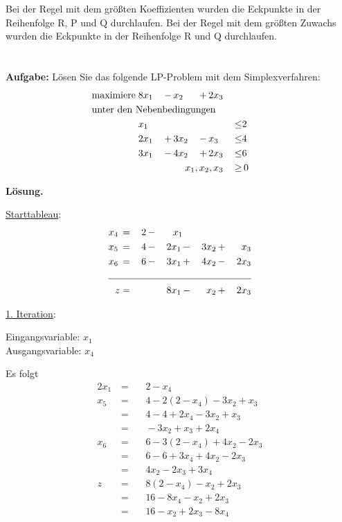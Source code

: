 \documentclass[10pt,a4paper,oneside,ngerman,numbers=noenddot]{scrartcl}
\begin{document}
			Bei der Regel mit dem größten Koeffizienten wurden die Eckpunkte in der Reihenfolge R, P und Q durchlaufen. Bei der Regel mit dem größten Zuwachs wurden die Eckpunkte in der Reihenfolge R und Q durchlaufen.
\section{} %
		
		\textbf{Aufgabe:} Lösen Sie das folgende LP-Problem mit dem Simplexverfahren:
		\begin{alignat*}{4}
			\text{maximiere}\; & 8x_{1} \,&-&\, x_{2} \,&+&\, 2x_{3} && \\
			\multicolumn{8}{l}{\text{unter den Nebenbedingungen}} && \\
			\;& x_{1} \,&& && &\leq & 2 \\
			\;& 2x_{1} \,&+&\, 3x_{2} \,&-&\, x_{3} \,&\leq & 4 \\
			\;& 3x_{1} \,&-&\, 4x_{2} \,&+&\, 2x_{3} \,&\leq & 6 \\
			\multicolumn{6}{r}{$x_{1}, x_{2}, x_{3}$} \,&\geq &\, 0
		\end{alignat*}
		
		\textbf{Lösung.}
		
		\underline{Starttableau}:
		\begin{alignat*}{5}
			x_{4} \,&=&\, 2 \,&-&\, x_{1} && && \\
			x_{5} \,&=&\, 4 \,&-&\, 2x_{1} \,&-&\, 3x_{2} \,&+&\, x_{3} \\
			x_{6} \,&=&\, 6 \,&-&\, 3x_{1} \,&+&\, 4x_{2} \,&-&\, 2x_{3} \\ \cline{1 - 9}
			z &=& &&\, 8x_{1} \,&-&\, x_{2} \,&+&\, 2x_{3}
		\end{alignat*}
		
		\underline{1. Iteration}:
		
		Eingangsvariable: $x_{1}$\\
		Ausgangsvariable: $x_{4}$
		
		Es folgt
		\begin{alignat*}{2}
			x_{1} \,&=&&\, 2 - x_{4} \\
			x_{5} \,&=&&\, 4 - 2\left(2 - x_{4}\right) - 3x_{2} + x_{3} \\
			&=&&\, 4 - 4 + 2x_{4} - 3x_{2} + x_{3} \\
			&=&&\, - 3x_{2} + x_{3} + 2x_{4} \\
			x_{6} \,&=&&\, 6 - 3\left(2 - x_{4}\right) + 4x_{2} - 2x_{3} \\
			&=&&\, 6 - 6 + 3x_{4} + 4x_{2} - 2x_{3} \\
			&=&&\, 4x_{2} - 2x_{3} + 3x_{4} \\
			z \,&=&&\, 8\left(2 - x_{4}\right) - x_{2} + 2x_{3} \\
			&=&&\, 16 - 8x_{4} - x_{2} + 2x_{3} \\
			&=&&\, 16 - x_{2} + 2x_{3} - 8x_{4}
		\end{alignat*}
		
\end{document}
